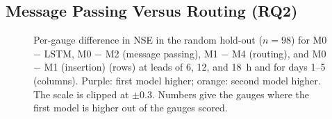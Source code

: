 \subsection{Message Passing Versus Routing (RQ2)}
\label{sec:res-rq2}

\begin{figure}
\caption{Per-gauge difference in NSE in the random hold-out ($n = 98$) for M0 $-$ LSTM, M0 $-$ M2 (message passing), M1 $-$ M4 (routing), and M0 $-$ M1 (insertion) (rows) at leads of 6, 12, and 18~h and for days 1--5 (columns). Purple: first model higher; orange: second model higher. The scale is clipped at $\pm 0.3$. Numbers give the gauges where the first model is higher out of the gauges scored.}
\label{fig:maps-contrasts}
\end{figure}

